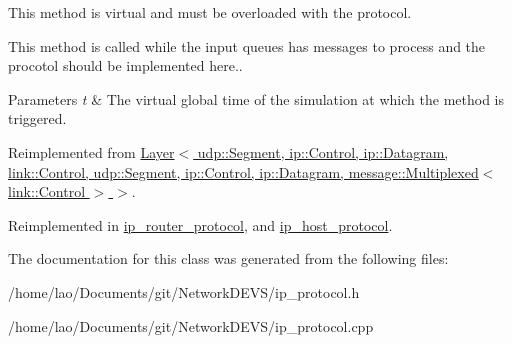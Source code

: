 This method is virtual and must be overloaded with the protocol. 

This method is called while the input queues has messages to process and the procotol should be implemented here..


\begin{DoxyParams}{Parameters}
{\em t} & The virtual global time of the simulation at which the method is triggered. \\
\hline
\end{DoxyParams}


Reimplemented from \hyperlink{classLayer_a1c82b14ba3efc37969f55c633a9b3173}{Layer$<$ udp\+::\+Segment, ip\+::\+Control, ip\+::\+Datagram, link\+::\+Control, udp\+::\+Segment, ip\+::\+Control, ip\+::\+Datagram, message\+::\+Multiplexed$<$ link\+::\+Control $>$ $>$}.



Reimplemented in \hyperlink{classip__router__protocol_a14cf3c7e1418ee8c6035b79626f99438}{ip\+\_\+router\+\_\+protocol}, and \hyperlink{classip__host__protocol_a2e2c43aeb81ae38702b7dec6f7df9227}{ip\+\_\+host\+\_\+protocol}.



The documentation for this class was generated from the following files\+:\begin{DoxyCompactItemize}
\item 
/home/lao/\+Documents/git/\+Network\+D\+E\+V\+S/ip\+\_\+protocol.\+h\item 
/home/lao/\+Documents/git/\+Network\+D\+E\+V\+S/ip\+\_\+protocol.\+cpp\end{DoxyCompactItemize}
